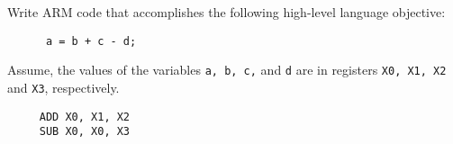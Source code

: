 \newpage
\begin{frame}[fragile]
    \begin{multicols}{2}
    \begin{tcolorbox}[enhanced,attach boxed title to top center={yshift=-3mm,yshifttext=-1mm},
  colback=red!5!white,colframe=red!75!black,colbacktitle=red!80!black,
  title=Try this,fonttitle=\bfseries,
  boxed title style={size=small,colframe=red!50!black} ]
  Write ARM code that accomplishes the following high-level language objective:
  \begin{verbatim}
      a = b + c - d;
  \end{verbatim}
  Assume, the values of the variables {\tt a, b, c,} and {\tt d} are in  registers {\tt X0, X1, X2} and {\tt X3}, respectively.\\
\end{tcolorbox}
        \columnbreak

\ifnum{}
 {\color{red}
 \begin{verbatim}
     ADD X0, X1, X2
     SUB X0, X0, X3
 \end{verbatim}
 }\fi
    \end{multicols}
\end{frame}


